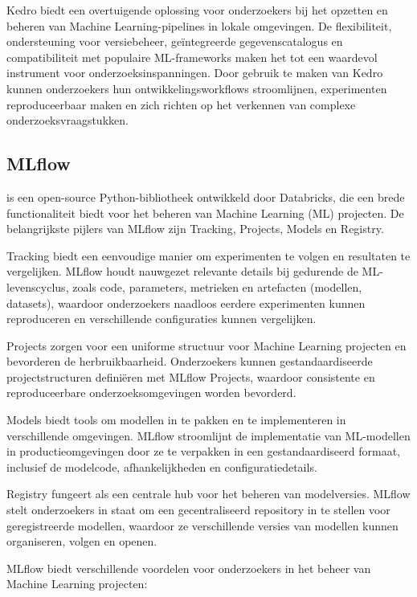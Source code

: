 Kedro biedt een overtuigende oplossing voor onderzoekers bij het opzetten en beheren van Machine Learning-pipelines in lokale omgevingen. De flexibiliteit, ondersteuning voor versiebeheer, geïntegreerde gegevenscatalogus en compatibiliteit met populaire ML-frameworks maken het tot een waardevol instrument voor onderzoeksinspanningen. Door gebruik te maken van Kedro kunnen onderzoekers hun ontwikkelingsworkflows stroomlijnen, experimenten reproduceerbaar maken en zich richten op het verkennen van complexe onderzoeksvraagstukken.
\subsection{MLflow}

\textcite{MLflow2023} is een open-source Python-bibliotheek ontwikkeld door Databricks, die een brede functionaliteit biedt voor het beheren van Machine Learning (ML) projecten. De belangrijkste pijlers van MLflow zijn Tracking, Projects, Models en Registry.

Tracking biedt een eenvoudige manier om experimenten te volgen en resultaten te vergelijken. MLflow houdt nauwgezet relevante details bij gedurende de ML-levenscyclus, zoals code, parameters, metrieken en artefacten (modellen, datasets), waardoor onderzoekers naadloos eerdere experimenten kunnen reproduceren en verschillende configuraties kunnen vergelijken.

Projects zorgen voor een uniforme structuur voor Machine Learning projecten en bevorderen de herbruikbaarheid. Onderzoekers kunnen gestandaardiseerde projectstructuren definiëren met MLflow Projects, waardoor consistente en reproduceerbare onderzoeksomgevingen worden bevorderd.

Models biedt tools om modellen in te pakken en te implementeren in verschillende omgevingen. MLflow stroomlijnt de implementatie van ML-modellen in productieomgevingen door ze te verpakken in een gestandaardiseerd formaat, inclusief de modelcode, afhankelijkheden en configuratiedetails.

Registry fungeert als een centrale hub voor het beheren van modelversies. MLflow stelt onderzoekers in staat om een gecentraliseerd repository in te stellen voor geregistreerde modellen, waardoor ze verschillende versies van modellen kunnen organiseren, volgen en openen.

MLflow biedt verschillende voordelen voor onderzoekers in het beheer van Machine Learning projecten:

